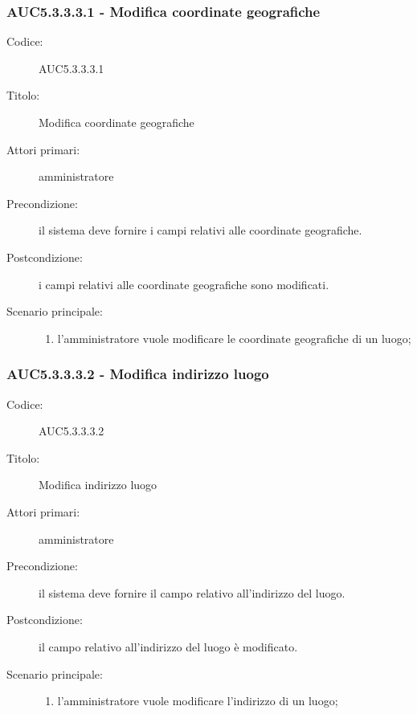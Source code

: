 \documentclass[../analisi-dei-requisiti.tex]{subfiles}
\begin{document}
\subsubsection{AUC5.3.3.3.1 - Modifica coordinate geografiche}%
\label{subsub:AUC5.3.3.3.1}
\begin{description}
  \item[Codice:] AUC5.3.3.3.1
  \item[Titolo:] Modifica coordinate geografiche
  \item[Attori primari:] amministratore
  \item[Precondizione:] il sistema deve fornire i campi relativi alle coordinate geografiche.
  \item[Postcondizione:] i campi relativi alle coordinate geografiche sono modificati.
  \item[Scenario principale:]
  \begin{enumerate}
    \item l'amministratore vuole modificare le coordinate geografiche di un luogo;
  \end{enumerate}
\end{description}

\subsubsection{AUC5.3.3.3.2 - Modifica indirizzo luogo}%
\label{subsub:AUC5.3.3.3.2}
\begin{description}
  \item[Codice:] AUC5.3.3.3.2
  \item[Titolo:] Modifica indirizzo luogo
  \item[Attori primari:] amministratore
  \item[Precondizione:] il sistema deve fornire il campo relativo all'indirizzo del luogo.
  \item[Postcondizione:] il campo relativo all'indirizzo del luogo è modificato.
  \item[Scenario principale:]
  \begin{enumerate}
    \item l'amministratore vuole modificare l'indirizzo di un luogo;
  \end{enumerate}
\end{description}
\end{document}
